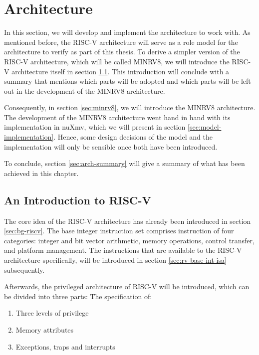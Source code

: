 
\chapter{Architecture}
\label{chp:arch}

In this section, we will develop and implement the architecture to work with.
As mentioned before, the RISC-V architecture will serve as a role model for the architecture to verify as part of this thesis.
To derive a simpler version of the RISC-V architecture, which will be called MINRV8, we will introduce the RISC-V architecture itself in section \ref{sec:risc-v}.
This introduction will conclude with a summary that mentions which parts will be adopted and which parts will be left out in the development of the MINRV8 architecture.

Consequently, in section \ref{sec:minrv8}, we will introduce the MINRV8 architecture.
The development of the MINRV8 architecture went hand in hand with its implementation in nuXmv, which we will present in section \ref{sec:model-implementation}.
Hence, some design decisions of the model and the implementation will only be sensible once both have been introduced.

To conclude, section \ref{sec:arch-summary} will give a summary of what has been achieved in this chapter.

\section{An Introduction to RISC-V}
\label{sec:risc-v}

The core idea of the RISC-V architecture has already been introduced in section \ref{sec:bg-riscv}.
The base integer instruction set comprises instruction of four categories: integer and bit vector arithmetic, memory operations, control transfer, and platform management.
The instructions that are available to the RISC-V architecture specifically, will be introduced in section \ref{sec:rv-base-int-isa} subsequently.

Afterwards, the privileged architecture of RISC-V will be introduced, which can be divided into three parts:
The specification of:
\begin{enumerate}
    \item Three levels of privilege
    \item Memory attributes
    \item Exceptions, traps and interrupts
\end{enumerate}

